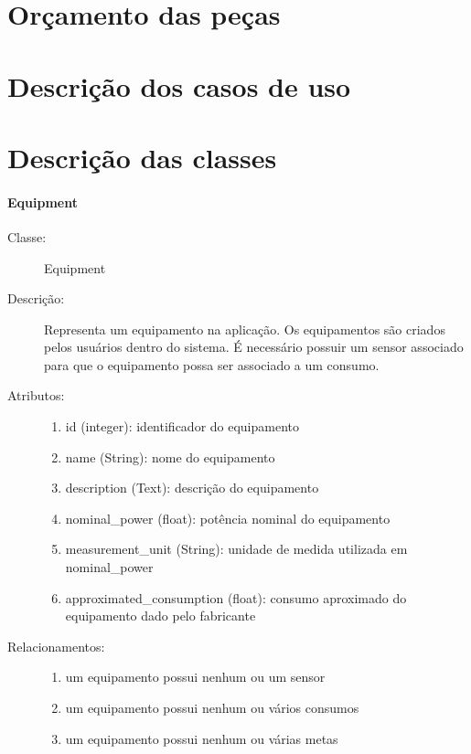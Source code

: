 \apendices
\chapter{Orçamento das peças}


\chapter{Descrição dos casos de uso}
\label{apendice_caso_uso}


\chapter{Descrição das classes}
\label{apendice_classes}
\subsubsection{Equipment}
\begin{description}
  \item[Classe:] Equipment
  \item[Descrição:] Representa um equipamento na aplicação. Os equipamentos são criados pelos usuários dentro do sistema. É necessário possuir um sensor associado para que o equipamento possa ser associado a um consumo.
  \item[Atributos:] \hfill
    \begin{enumerate}
      \item id (integer): identificador do equipamento
      \item name (String): nome do equipamento
      \item description (Text): descrição do equipamento 
      \item nominal\_power (float): potência nominal do equipamento 
      \item measurement\_unit (String): unidade de medida utilizada em nominal\_power
      \item approximated\_consumption (float): consumo aproximado do equipamento dado pelo fabricante 
    \end{enumerate}
  \item[Relacionamentos:] \hfill
    \begin{enumerate}
      \item um equipamento possui nenhum ou um sensor
      \item um equipamento possui nenhum ou vários consumos
      \item um equipamento possui nenhum ou várias metas
    \end{enumerate}
\end{description} 
%
